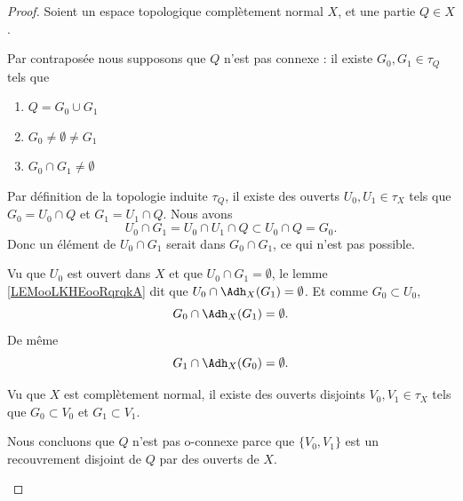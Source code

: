 \begin{proof}
	Soient un espace topologique complètement normal \( X\), et une partie \( Q\in X\).

	\begin{subproof}
		\spitem[Contraposée]
		Par contraposée nous supposons que \( Q\) n'est pas connexe : il existe \( G_0,G_1\in \tau_Q\) tels que
		\begin{enumerate}
			\item
			      \( Q=G_0\cup G_1\)
			\item
			      \( G_0\neq\emptyset\neq G_1\)
			\item
			      \( G_0\cap G_1\neq \emptyset\)
		\end{enumerate}
		Par définition de la topologie induite \( \tau_Q\), il existe des ouverts \( U_0,U_1\in \tau_X\) tels que \( G_0=U_0\cap Q\) et \( G_1=U_1\cap Q\).
		\spitem[\( U_0\cap G_1=\emptyset\)]
		Nous avons
		\begin{equation}
			U_0\cap G_1=U_0\cap U_1\cap Q\subset U_0\cap Q=G_0.
		\end{equation}
		Donc un élément de \( U_0\cap G_1\) serait dans \( G_0\cap G_1\), ce qui n'est pas possible.

		\spitem[Fermeture]
		Vu que \( U_0\) est ouvert dans \( X\) et que \( U_0\cap G_1=\emptyset\), le lemme \ref{LEMooLKHEooRqrqkA} dit que \( U_0\cap \Adh_X(G_1)=\emptyset\). Et comme \( G_0\subset U_0\),
		\begin{equation}
			G_0\cap\Adh_X(G_1)=\emptyset.
		\end{equation}
		De même
		\begin{equation}
			G_1\cap\Adh_X(G_0)=\emptyset.
		\end{equation}

		Vu que \( X\) est complètement normal, il existe des ouverts disjoints \( V_0,V_1\in \tau_X\) tels que \( G_0\subset V_0\) et \( G_1\subset V_1\).

		\spitem[Conclusion]
		Nous concluons que \( Q\) n'est pas o-connexe parce que \( \{ V_0,V_1 \}\) est un recouvrement disjoint de \( Q\) par des ouverts de \( X\).
	\end{subproof}
\end{proof}

